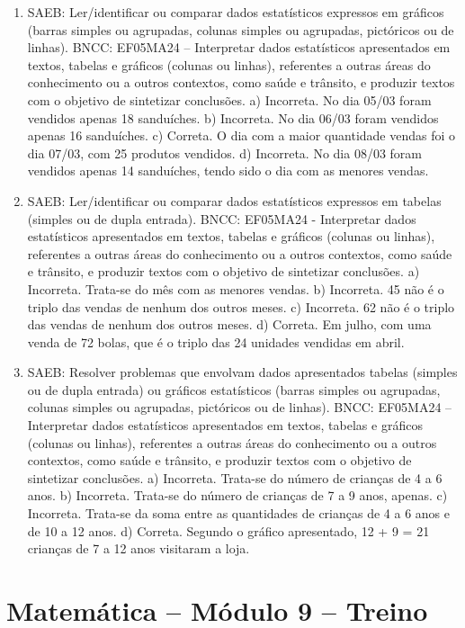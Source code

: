 \begin{enumerate}
\item
SAEB: Ler/identificar ou comparar dados estatísticos expressos em gráficos (barras simples ou agrupadas, colunas simples ou agrupadas, pictóricos ou de linhas).
BNCC: EF05MA24 – Interpretar dados estatísticos apresentados em textos, tabelas e gráficos (colunas
ou linhas), referentes a outras áreas do conhecimento ou a outros contextos, como saúde e
trânsito, e produzir textos com o objetivo de sintetizar conclusões.
a) Incorreta. No dia 05/03 foram vendidos apenas 18 sanduíches.
b) Incorreta. No dia 06/03 foram vendidos apenas 16 sanduíches.
c) Correta. O dia com a maior quantidade vendas foi o dia 07/03, com 25 produtos
vendidos.
d) Incorreta. No dia 08/03 foram vendidos apenas 14 sanduíches, tendo sido o dia com as menores vendas.

\item
SAEB: Ler/identificar ou comparar dados estatísticos expressos em tabelas (simples ou de dupla entrada).
BNCC: EF05MA24 - Interpretar dados estatísticos apresentados em textos, tabelas e gráficos (colunas
ou linhas), referentes a outras áreas do conhecimento ou a outros contextos, como saúde e
trânsito, e produzir textos com o objetivo de sintetizar conclusões.
a) Incorreta. Trata-se do mês com as menores vendas.
b) Incorreta. 45 não é o triplo das vendas de nenhum dos outros meses.
c) Incorreta. 62 não é o triplo das vendas de nenhum dos outros meses.
d) Correta. Em julho, com uma venda de 72 bolas, que é o triplo das 24 unidades vendidas em abril.

\item
SAEB: Resolver problemas que envolvam dados apresentados tabelas (simples ou de dupla entrada) ou gráficos estatísticos (barras simples ou agrupadas, colunas simples ou agrupadas, pictóricos ou de linhas).
BNCC: EF05MA24 – Interpretar dados estatísticos apresentados em textos, tabelas e gráficos (colunas
ou linhas), referentes a outras áreas do conhecimento ou a outros contextos, como saúde e
trânsito, e produzir textos com o objetivo de sintetizar conclusões.
a) Incorreta. Trata-se do número de crianças de 4 a 6 anos.
b) Incorreta. Trata-se do número de crianças de 7 a 9 anos, apenas.
c) Incorreta. Trata-se da soma entre as quantidades de crianças de 4 a 6 anos e de 10 a 12 anos.
d) Correta. Segundo o gráfico apresentado, 12 + 9 = 21 crianças de 7 a 12 anos
visitaram a loja.
\end{enumerate}

\section*{Matemática -- Módulo 9 -- Treino}

